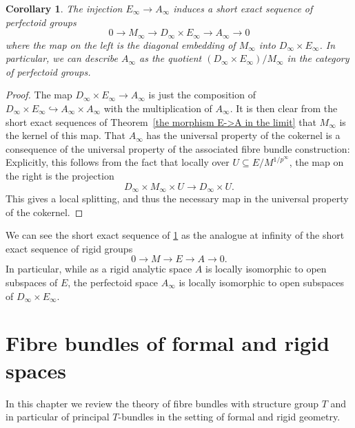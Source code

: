 \documentclass[10pt,oneside]{amsart}
\newtheorem{corollary}[theorem]{Corollary}
\theoremstyle{definition}
\begin{document}
	\begin{corollary}\label{A_infty as a quotient of D_infty times E_infty}
		The injection $E_\infty \rightarrow A_\infty$ induces a short exact sequence of perfectoid groups
		\[0\rightarrow M_\infty\rightarrow D_\infty \times E_\infty \rightarrow A_\infty\rightarrow 0\]
		where the map on the left is the diagonal embedding of $M_\infty$ into $D_\infty\times E_\infty$. In particular, we can describe $A_\infty$ as the quotient $(D_\infty\times E_\infty)/M_\infty$ in the category of perfectoid groups.
	\end{corollary}
	\begin{proof}
		The map $D_\infty\times E_\infty \rightarrow A_\infty$ is just the composition of $D_\infty\times E_\infty \hookrightarrow A_\infty\times A_\infty$ with the multiplication of $A_\infty$. It is then clear from the short exact sequences of Theorem~\ref{the morphism E->A in the limit} that $M_\infty$ is the kernel of this map. That $A_\infty$ has the universal property of the cokernel is a consequence of the universal property of the associated fibre bundle construction: Explicitly, this follows from the fact that locally over $U\subseteq E/M^{1/p^\infty}$, the map on the right is the projection
		\[D_\infty \times M_\infty \times U \rightarrow D_\infty\times U.\]
		This gives a local splitting, and thus the necessary map in the universal property of the cokernel.
	\end{proof}
	We can see the short exact sequence of \ref{A_infty as a quotient of D_infty times E_infty} as the analogue at infinity of the short exact sequence 	of rigid groups
		\[0\rightarrow M\rightarrow E\rightarrow A\rightarrow 0.\]
	In particular, while as a rigid analytic space $A$ is locally isomorphic to open subspaces of $E$, the perfectoid space $A_\infty$ is locally isomorphic to open subspaces of $D_\infty \times E_\infty$.
	
 
	
	
	
		\appendix
	\section{Fibre bundles of formal and rigid spaces}
	In this chapter we review the theory of fibre bundles with structure group $T$ and in particular of principal $T$-bundles in the setting of formal and rigid geometry.
		
\end{document}

